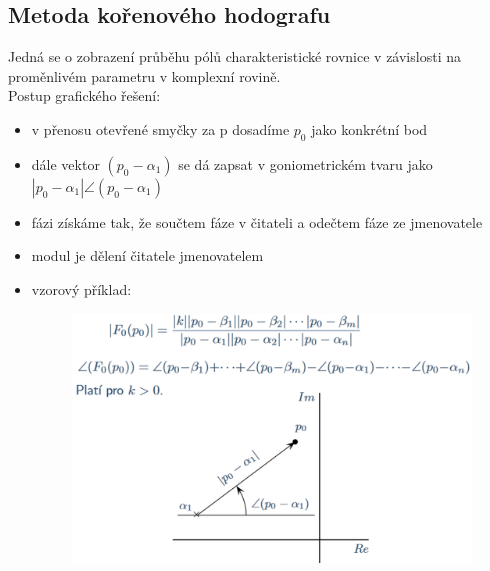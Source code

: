 \subsection*{Metoda kořenového hodografu}
Jedná se o zobrazení průběhu pólů charakteristické rovnice v závislosti na proměnlivém parametru v komplexní rovině.\\
Postup grafického řešení:
\begin{itemize}
    \item v přenosu otevřené smyčky za p dosadíme \(p_0\) jako konkrétní bod
    \item dále vektor $(p_0 - \alpha_1)$ se dá zapsat v goniometrickém tvaru jako $|p_0 - \alpha_1|\angle (p_0 - \alpha_1)$
    \item fázi získáme tak, že součtem fáze v čitateli a odečtem fáze ze jmenovatele
    \item modul je dělení čitatele jmenovatelem
    \item vzorový příklad:
          \begin{figure}[H]
              \includegraphics*[scale = 0.3]{images/hodograf.png}
          \end{figure}
\end{itemize}

